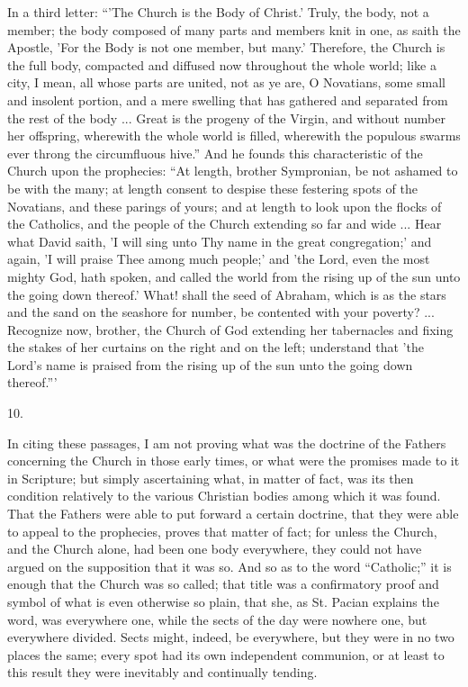 In a third letter: ``'The Church is the Body of
Christ.' Truly, the body, not a member; the body composed
of many parts and members knit in one, as saith the
Apostle, 'For the Body is not one member, but many.'
Therefore, the Church is the full body, compacted and
diffused now throughout the whole world; like a city, I
mean, all whose parts are united, not as ye are, O
Novatians, some small and insolent portion, and a mere
swelling that has gathered and separated from the rest of
the body ... Great is the progeny of the Virgin, and
without number her offspring, wherewith the whole world
is filled, wherewith the populous swarms ever throng the
circumfluous hive.'' And he founds this
characteristic of the Church upon the prophecies:
``At length, brother Sympronian, be not ashamed to be
with the many; at length consent to despise these
festering spots of the Novatians, and these parings of
yours; and at length to look upon the flocks of the
Catholics, and the people of the Church extending so far
and wide ... Hear what David saith, 'I will sing unto Thy
name in the great congregation;' and again, 'I will
praise Thee among much people;' and 'the Lord, even the
most mighty God, hath spoken, and called the world from
the rising up of the sun unto the going down thereof.'
What! shall the seed of Abraham, which is as the stars
and the sand on the seashore for number, be contented
with your poverty? ... Recognize now, brother, the Church
of God extending her tabernacles and fixing the stakes of
her curtains on the right and on the left; understand
that 'the Lord's name is praised from the rising up of
the sun unto the going down thereof.'''

10.

In citing these passages, I am not proving what was
the doctrine of the Fathers concerning the Church in
those early times, or what were the promises made to it
in Scripture; but simply ascertaining what, in matter of
fact, was its then condition relatively to the various
Christian bodies among which it was found. That the
Fathers were able to put forward a certain doctrine, that
they were able to appeal to the prophecies, proves that
matter of fact; for unless the Church, and the Church
alone, had been one body everywhere, they could not have
argued on the supposition that it was so. And so as to
the word ``Catholic;'' it is enough that the
Church was so called; that title was a confirmatory proof
and symbol of what is even otherwise so plain, that she,
as St. Pacian explains the word, was everywhere one,
while the sects of the day were nowhere one, but
everywhere divided. Sects might, indeed, be everywhere,
but they were in no two places the same; every spot had
its own independent communion, or at least to this result
they were inevitably and continually tending.

